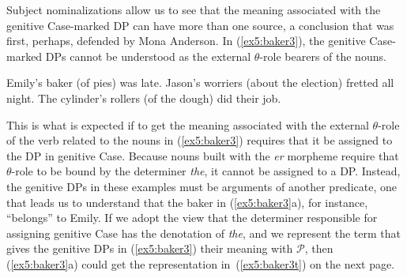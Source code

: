 Subject nominalizations allow us to see that the meaning associated with the genitive Case-marked DP can have more than one source, a conclusion that was first, perhaps, defended by Mona Anderson.\cite{Anderson:1983a} In (\ref{ex5:baker3}), the genitive Case-marked DPs cannot be understood as the external $\theta$-role bearers of the nouns.
\begin{exe}
	\raggedright
	\ex \label{ex5:baker3} 
	\begin{xlist}
		\ex Emily's baker (of pies) was late.
		\ex Jason's worriers (about the election) fretted all night.
		\ex The cylinder's rollers (of the dough) did their job.
	\end{xlist}
\end{exe}
This is what is expected if to get the meaning associated with the external $\theta$-role of the verb related to the nouns in (\ref{ex5:baker3}) requires that it be assigned to the DP in genitive Case. Because nouns built with the \emph{er} morpheme require that $\theta$-role to be bound by the determiner \emph{the}, it cannot be assigned to a DP. Instead, the genitive DPs in these examples must be arguments of another predicate, one that leads us to understand that the baker in (\ref{ex5:baker3}a), for instance, ``belongs'' to Emily. If we adopt the view that the determiner responsible for assigning genitive Case has the denotation of \emph{the},%
%
%
%
and we represent the term that gives the genitive DPs in (\ref{ex5:baker3}) their meaning with $\mathcal{P}$, then (\ref{ex5:baker3}a) could get the representation in~(\ref{ex5:baker3t}) on the next page.

